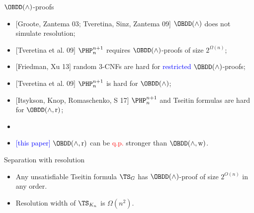 \begin{frame}{$\OBDD(\land)$-proofs}
    \begin{itemize}
        \item{} [Groote, Zantema 03; Tveretina, Sinz, Zantema 09] $\OBDD(\land)$ does not simulate
            resolution;
        \pause
        \item{} [Tveretina et al. 09] $\PHP^{n + 1}_n$ requires $\OBDD(\land)$-proofs of size
            $2^{\Omega(n)}$;
        \pause
        \item{} [Friedman, Xu 13] random $3$-CNFs are hard for \textcolor{blue}{restricted}
            $\OBDD(\land)$-proofs;
        \pause
        \item{} [Tveretina et al. 09] $\PHP^{n + 1}_{n}$ is hard for $\OBDD(\land)$;
        \pause
        \item{} [Itsykson, Knop, Romaschenko, S 17] $\PHP^{n + 1}_{n}$ and Tseitin formulas are hard for
            $\OBDD(\land, \reordering)$;
        \pause
        \item{} 
        \pause
        \pause    
        \item{} \textcolor{blue}{[this paper]} $\OBDD(\land, \reordering)$ can be \textcolor{red}{q.p.}
            stronger than $\OBDD(\land, \weakening)$.
    \end{itemize}    
\end{frame}


\begin{frame}{Separation with resolution}
    \begin{itemize}
        \item Any unsatisfiable Tseitin formula $\TS_{G}$ has $\OBDD(\land)$-proof of size $2^{O(n)}$
            in any order.
		\item Resolution width of $\TS_{K_n}$ is $\Omega(n^2)$.

            
    \end{itemize}
\end{frame}


